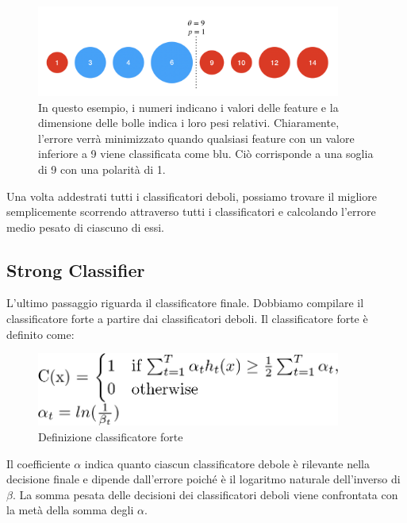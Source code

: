 \begin{figure}[h!]
	\centering
	\includegraphics[width=100mm]{img/4/violahaar_1_6}
	\caption{\fontsize{10px}{0mm}\selectfont In questo esempio, i numeri indicano i valori delle feature e la dimensione delle bolle indica i loro pesi relativi. Chiaramente, l'errore verrà minimizzato quando qualsiasi feature con un valore inferiore a 9 viene classificata come blu. Ciò corrisponde a una soglia di 9 con una polarità di 1. \label{fig:violahaar_1_6}}
\end{figure}
Una volta addestrati tutti i classificatori deboli, possiamo trovare il migliore semplicemente scorrendo attraverso tutti i classificatori e calcolando l'errore medio pesato di ciascuno di essi.\newpage

\subsection{Strong Classifier}
L'ultimo passaggio riguarda il classificatore finale. Dobbiamo compilare il classificatore forte a partire dai classificatori deboli. Il classificatore forte è definito come:

\begin{figure}[h!]
	\centering
	\includegraphics[width=100mm]{img/4/violahaar_1_7}
	\caption{\fontsize{10px}{0mm}\selectfont Definizione classificatore forte \label{fig:violahaar_1_7}}
\end{figure}


Il coefficiente $\alpha$ indica quanto ciascun classificatore debole è rilevante nella decisione finale e dipende dall'errore poiché è il logaritmo naturale dell'inverso di $\beta$. La somma pesata delle decisioni dei classificatori deboli viene confrontata con la metà della somma degli $\alpha$.
\cite{violajones}

